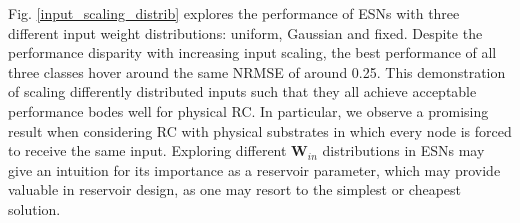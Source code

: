 Fig. \ref{input_scaling_distrib} explores the performance of ESNs with three
different input weight distributions: uniform, Gaussian and fixed. Despite the
performance disparity with increasing input scaling, the best performance of all
three classes hover around the same NRMSE of around 0.25. This demonstration of
scaling differently distributed inputs such that they all achieve acceptable
performance bodes well for physical RC. In particular, we observe a promising
result when considering RC with physical substrates in which every node is
forced to receive the same input. Exploring different $\mathbf{W}_{in}$
distributions in ESNs may give an intuition for its importance as a reservoir
parameter, which may provide valuable in reservoir design, as one may resort to
the simplest or cheapest solution.

